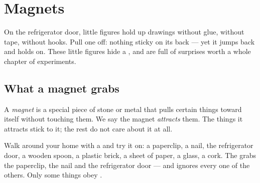 \chapter{Magnets}\label{ch:g1:magnets}

On the refrigerator door, little figures hold up drawings without
glue, without tape, without hooks. Pull one off: nothing sticky on
its back --- yet it jumps back and holds on. These little figures
hide a , and  are full of surprises worth a whole
chapter of experiments.

\section{What a magnet grabs}

\begin{definition}[Magnets]\label{def:g1:magnets:magnet}
A \emph{magnet} is a special piece of stone or metal
that pulls certain things toward itself without touching them. We say
the magnet \emph{attracts} them. The things it
attracts stick to it; the rest do not care about it at all.
\end{definition}

\begin{example}\label{ex:g1:magnets:test}
Walk around your home with a  and try it on: a paperclip, a
nail, the refrigerator door, a wooden spoon, a plastic brick, a
sheet of paper, a glass, a cork. The  grabs the paperclip, the
nail and the refrigerator door --- and ignores every one of the
others. Only some things obey .
\end{example}

